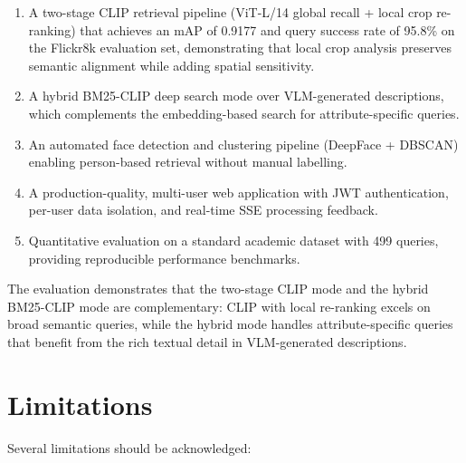 \documentclass[12pt,a4paper,oneside]{report}
\begin{document}
\begin{enumerate}[leftmargin=*]
  \item A two-stage CLIP retrieval pipeline (ViT-L/14 global recall + local crop re-ranking) that achieves an mAP of 0.9177 and query success rate of 95.8\% on the Flickr8k evaluation set, demonstrating that local crop analysis preserves semantic alignment while adding spatial sensitivity.
  \item A hybrid BM25-CLIP deep search mode over VLM-generated descriptions, which complements the embedding-based search for attribute-specific queries.
  \item An automated face detection and clustering pipeline (DeepFace + DBSCAN) enabling person-based retrieval without manual labelling.
  \item A production-quality, multi-user web application with JWT authentication, per-user data isolation, and real-time SSE processing feedback.
  \item Quantitative evaluation on a standard academic dataset with 499 queries, providing reproducible performance benchmarks.
\end{enumerate}

The evaluation demonstrates that the two-stage CLIP mode and the hybrid BM25-CLIP mode are complementary: CLIP with local re-ranking excels on broad semantic queries, while the hybrid mode handles attribute-specific queries that benefit from the rich textual detail in VLM-generated descriptions.

\section{Limitations}

Several limitations should be acknowledged:
\end{document}
